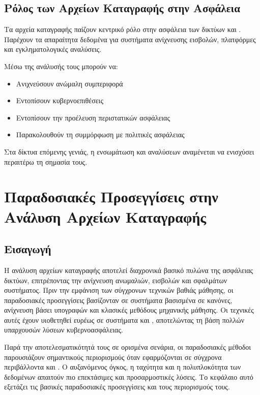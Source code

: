 \subsection{Ρόλος των Αρχείων Καταγραφής στην Ασφάλεια}

Τα αρχεία καταγραφής παίζουν κεντρικό ρόλο στην ασφάλεια των δικτύων  και . Παρέχουν τα απαραίτητα δεδομένα για συστήματα ανίχνευσης εισβολών, πλατφόρμες  και εγκληματολογικές αναλύσεις.

Μέσω της ανάλυσής τους μπορούν να:
\begin{itemize}
    \item Ανιχνεύσουν ανώμαλη συμπεριφορά
    \item Εντοπίσουν κυβερνοεπιθέσεις
    \item Εντοπίσουν την προέλευση περιστατικών ασφάλειας
    \item Παρακολουθούν τη συμμόρφωση με πολιτικές ασφάλειας
\end{itemize}

Στα δίκτυα επόμενης γενιάς, η ενσωμάτωση  και αναλύσεων  αναμένεται να ενισχύσει περαιτέρω τη σημασία τους.

\section{Παραδοσιακές Προσεγγίσεις στην Ανάλυση Αρχείων Καταγραφής}

\subsection{Εισαγωγή}

Η ανάλυση αρχείων καταγραφής αποτελεί διαχρονικά βασικό πυλώνα της ασφάλειας δικτύων, επιτρέποντας την ανίχνευση ανωμαλιών, εισβολών και σφαλμάτων συστήματος. Πριν την εμφάνιση των σύγχρονων τεχνικών βαθιάς μάθησης, οι παραδοσιακές προσεγγίσεις βασίζονταν σε συστήματα βασισμένα σε κανόνες, ανίχνευση βάσει υπογραφών και κλασικές μεθόδους μηχανικής μάθησης. Οι τεχνικές αυτές έχουν υιοθετηθεί ευρέως σε συστήματα  και , αποτελώντας τη βάση πολλών υπαρχουσών λύσεων κυβερνοασφάλειας.

Παρά την αποτελεσματικότητά τους σε ορισμένα σενάρια, οι παραδοσιακές μέθοδοι παρουσιάζουν σημαντικούς περιορισμούς όταν εφαρμόζονται σε σύγχρονα περιβάλλοντα  και . Ο αυξανόμενος όγκος, η ταχύτητα και η πολυπλοκότητα των δεδομένων απαιτούν πιο επεκτάσιμες και προσαρμοστικές λύσεις. Το κεφάλαιο αυτό εξετάζει τις βασικές παραδοσιακές προσεγγίσεις και τους περιορισμούς τους.

